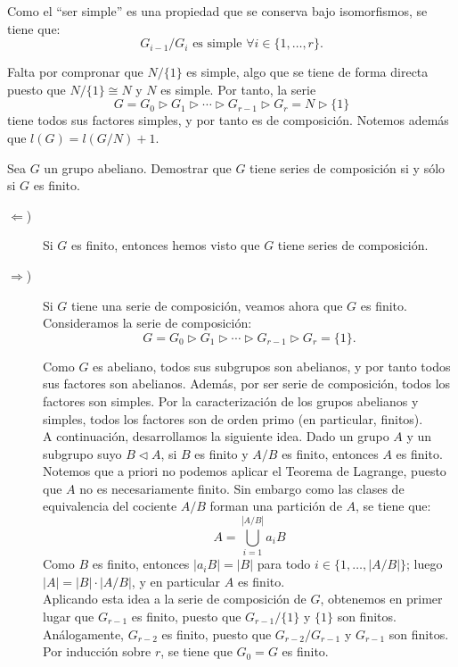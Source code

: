 \begin{ejercicio}
    Como el ``ser simple'' es una propiedad que se conserva bajo isomorfismos, se tiene que:
    \begin{equation*}
        G_{i-1}/G_i \text{ es simple } \forall i\in \{1,\ldots,r\}.
    \end{equation*}

    Falta por compronar que $N/\{1\}$ es simple, algo que se tiene de forma directa puesto que $N/\{1\}\cong N$ y $N$ es simple. Por tanto, la serie
    \[
        G = G_0 \rhd G_1 \rhd \cdots \rhd G_{r-1} \rhd G_r = N \rhd \{1\}
    \]
    tiene todos sus factores simples, y por tanto es de composición. Notemos además que $l(G)=l(G/N)+1$.    
\end{ejercicio}

\begin{ejercicio}
    Sea $G$ un grupo abeliano. Demostrar que $G$ tiene series de composición si y sólo si $G$ es finito.
    \begin{description}
        \item[$\Longleftarrow$)] Si $G$ es finito, entonces hemos visto que $G$ tiene series de composición.
        
        \item[$\Longrightarrow$)] Si $G$ tiene una serie de composición, veamos ahora que $G$ es finito. Consideramos la serie de composición:
        \[
            G = G_0 \rhd G_1 \rhd \cdots \rhd G_{r-1} \rhd G_r = \{1\}.
        \]

        Como $G$ es abeliano, todos sus subgrupos son abelianos, y por tanto todos sus factores son abelianos. Además, por ser serie de composición, todos los factores son simples. Por la caracterización de los grupos abelianos y simples, todos los factores son de orden primo (en particular, finitos).\\

        A continuación, desarrollamos la siguiente idea. Dado un grupo $A$ y un subgrupo suyo $B\lhd A$, si $B$ es finito y $A/B$ es finito, entonces $A$ es finito. Notemos que a priori no podemos aplicar el Teorema de Lagrange, puesto que $A$ no es necesariamente finito. Sin embargo como las clases de equivalencia del cociente $A/B$ forman una partición de $A$, se tiene que:
        \begin{equation*}
            A=\bigcup_{i=1}^{|A/B|} a_iB
        \end{equation*}
        Como $B$ es finito, entonces $|a_iB|=|B|$ para todo $i\in \{1,\ldots,|A/B|\}$; luego $|A|=|B|\cdot |A/B|$, y en particular $A$ es finito.\\

        Aplicando esta idea a la serie de composición de $G$, obtenemos en primer lugar que $G_{r-1}$ es finito, puesto que $G_{r-1}/\{1\}$ y $\{1\}$ son finitos. Análogamente, $G_{r-2}$ es finito, puesto que $G_{r-2}/G_{r-1}$ y $G_{r-1}$ son finitos. Por inducción sobre $r$, se tiene que $G_{0}=G$ es finito.
    \end{description}
\end{ejercicio}

